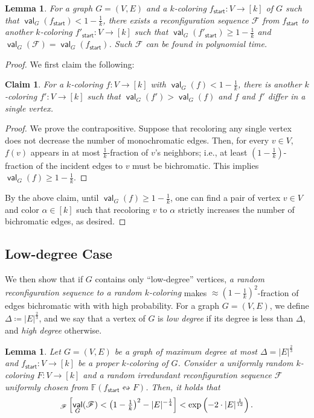 \documentclass[11pt,fleqn]{article}
\renewcommand{\geq}{\geqslant}
\newcommand{\reco}{\leftrightsquigarrow}
\newcommand{\defeq}{\coloneq}
\DeclareMathOperator{\val}{\mathsf{val}}
\newcommand{\sss}{\mathsf{start}}
\newcommand{\f}{f}
\newcommand{\frnd}{F}
\newcommand{\sqcol}{\scrF}
\newcommand{\stsqcol}{\bbF}
\newcommand{\bbF}{\mathbb{F}}
\newcommand{\scrF}{\mathscr{F}}
\let\Pr\relax\DeclareMathOperator*{\Pr}{\mathbb{P}}
\newtheorem{lemma}[theorem]{Lemma}
\newtheorem{claim}[theorem]{Claim}
\theoremstyle{definition}
\numberwithin{equation}{section}
\begin{document}
\begin{lemma}
\label{lem:Cut-alg:low-value}
For a graph $G=(V,E)$ and
a $k$-coloring $\f_\sss \colon V \to [k]$ of $G$ such that
$\val_G(\f_\sss) < 1 - \frac{1}{k}$,
there exists a reconfiguration sequence $\sqcol$
from $\f_\sss$ to another $k$-coloring $\f'_\sss \colon V \to [k]$ such that
$\val_G(\f'_\sss) \geq 1-\frac{1}{k}$ and $\val_G(\sqcol) = \val_G(\f_\sss)$.
Such $\sqcol$ can be found in polynomial time.
\end{lemma}
\begin{proof} We first claim the following:
\begin{claim}
For a $k$-coloring $\f \colon V \to [k]$ with
$\val_G(\f) < 1 - \frac{1}{k}$,
there is another $k$-coloring $\f' \colon V \to [k]$ such that
$\val_G(\f') > \val_G(\f)$ and
$\f$ and $\f'$ differ in a single vertex.
\end{claim}
\begin{proof}
We prove the contrapositive.
Suppose that recoloring any single vertex does not decrease the number of monochromatic edges.
Then, for every $v \in V$, $\f(v)$ appears in at most $\frac{1}{k}$-fraction of $v$'s neighbors; i.e.,
at least $\left(1-\frac{1}{k}\right)$-fraction of the incident edges to $v$ must be bichromatic.
This implies $\val_G(\f) \geq 1-\frac{1}{k}$.
\end{proof}
By the above claim,
until $\val_G(\f) \geq 1-\frac{1}{k}$,
one can find a pair of vertex $v \in V$ and color $\alpha \in [k]$ such that
recoloring $v$ to $\alpha$ strictly increases the number of bichromatic edges, as desired.
\end{proof}


\subsection{Low-degree Case}
\label{subsec:Cut-alg:low-degree}


We then show that
if $G$ contains only ``low-degree'' vertices,
\emph{a random reconfiguration sequence to a random $k$-coloring}
makes $\approx \left(1-\frac{1}{k}\right)^2$-fraction of edges bichromatic with
with high probability.
For a graph $G = (V,E)$,
we define $\Delta \defeq |E|^{\frac{2}{3}}$, and
we say that
a vertex of $G$ is \emph{low degree} if its degree is less than $\Delta$, and
\emph{high degree} otherwise.


\begin{lemma}
\label{lem:Cut-alg:low-degree}
Let $G=(V,E)$ be a graph of maximum degree at most $\Delta = |E|^{\frac{2}{3}}$ and
$\f_\sss \colon V \to [k]$ be a proper $k$-coloring of $G$.
Consider a uniformly random $k$-coloring $\frnd \colon V \to[k]$ and
a random irredundant reconfiguration sequence $\sqcol$
uniformly chosen from $\stsqcol(\f_\sss \reco \frnd)$.
Then, it holds that
\begin{align}
    \Pr_{\sqcol}\left[
        \val_G(\sqcol) < \left(1-\tfrac{1}{k}\right)^2 - |E|^{-\frac{1}{4}}
    \right]
    < \exp\left(-2 \cdot |E|^\frac{1}{12}\right).
\end{align}
\end{lemma}
\end{document}
